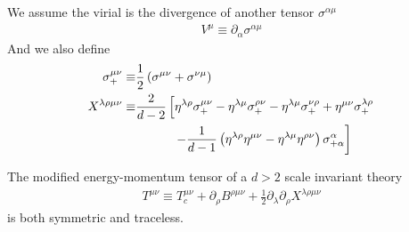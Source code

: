 \documentclass[10pt]{article}
\begin{document}
We assume the virial is the divergence of another tensor $\sigma^{\alpha\mu}$
\begin{align}
    V^\mu\equiv\partial_\alpha\sigma^{\alpha\mu}\label{eq:conformal_tenensor:condition}
\end{align}
And we also define
\begin{subequations}
    \begin{align}
        \sigma^{\mu\nu}_+\equiv     & \frac{1}{2}\left(\sigma^{\mu\nu}+\sigma^{\nu\mu}\right)                                                                                                                         \\
        X^{\lambda\rho\mu\nu}\equiv & \frac{2}{d-2}\left[\eta^{\lambda\rho}\sigma_+^{\mu\nu}-\eta^{\lambda\mu}\sigma_+^{\rho\nu}-\eta^{\lambda\mu}\sigma_+^{\nu\rho}+\eta^{\mu\nu}\sigma^{\lambda\rho}_+\right.\notag \\
                                    & \quad\quad\quad\left.-\frac{1}{d-1}\left(\eta^{\lambda\rho}\eta^{\mu\nu}-\eta^{\lambda\mu}\eta^{\rho\nu}\right)\sigma^{\alpha}_{+\alpha}\right]
    \end{align}
\end{subequations}
\begin{claim}
    The modified energy-momentum tensor of a $d>2$ scale invariant theory
    \begin{align}
        T^{\mu\nu}\equiv T^{\mu\nu}_c+\partial_\rho B^{\rho\mu\nu}+\frac{1}{2}\partial_\lambda\partial_\rho X^{\lambda\rho\mu\nu}\label{eq:conformal_tensor:modified_tensor}
    \end{align}
    is both symmetric and traceless.
\end{claim}
\end{document}
